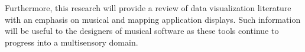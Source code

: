 \documentclass[11pt]{article}
\begin{document}
	Furthermore, this research will provide a review of data visualization literature with an emphasis on musical and mapping application displays. Such information will be useful to the designers of musical software as these tools continue to progress into a multisensory domain.  
	

\clearpage


\nocite{*}

\end{document}

